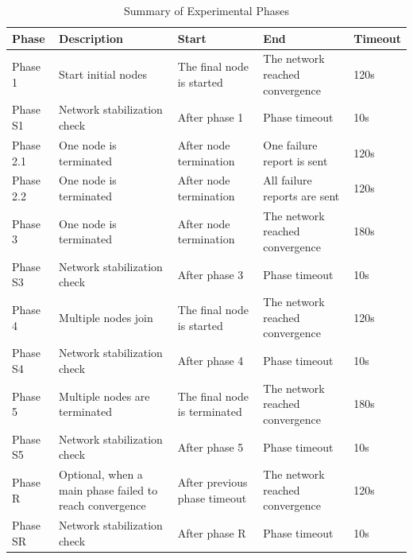 \begin{table}[htbp]
  \centering
  \caption{Summary of Experimental Phases}
  \label{tab:experimental_phases}
  \renewcommand{\arraystretch}{1.3}
  \begin{tabularx}{\textwidth}{
      C{1.5cm}
      Z
      Z
      Z
      C{1.8cm}
    }
    \toprule
    \textbf{Phase} & \textbf{Description}                                    & \textbf{Start}               & \textbf{End}                    & \textbf{Timeout} \\
    \midrule
    Phase 1        & Start initial nodes                                     & The final node is started    & The network reached convergence & 120s             \\
    Phase S1       & Network stabilization check                             & After phase 1                & Phase timeout                   & 10s              \\
    Phase 2.1      & One node is terminated                                  & After node termination       & One failure report is sent      & 120s             \\
    Phase 2.2      & One node is terminated                                  & After node termination       & All failure reports are sent    & 120s             \\
    Phase 3        & One node is terminated                                  & After node termination       & The network reached convergence & 180s             \\
    Phase S3       & Network stabilization check                             & After phase 3                & Phase timeout                   & 10s              \\
    Phase 4        & Multiple nodes join                                     & The final node is started    & The network reached convergence & 120s             \\
    Phase S4       & Network stabilization check                             & After phase 4                & Phase timeout                   & 10s              \\
    Phase 5        & Multiple nodes are terminated                           & The final node is terminated & The network reached convergence & 180s             \\
    Phase S5       & Network stabilization check                             & After phase 5                & Phase timeout                   & 10s              \\
    Phase R        & Optional, when a main phase failed to reach convergence & After previous phase timeout & The network reached convergence & 120s             \\
    Phase SR       & Network stabilization check                             & After phase R                & Phase timeout                   & 10s              \\
    \bottomrule
  \end{tabularx}
\end{table}

